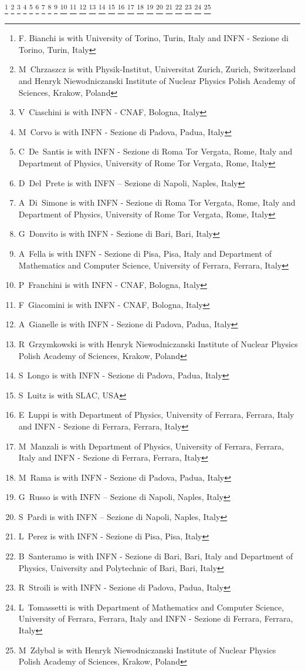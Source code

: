 \documentclass[journal]{IEEEtran}
\begin{document}
{\thanks{F. Bianchi is with University of Torino, Turin, Italy and INFN - Sezione di Torino, Turin, Italy}%
\thanks{M~Chrzaszcz is with Physik-Institut, Universitat Zurich, Zurich, Switzerland and Henryk Niewodniczanski Institute of Nuclear Physics Polish Academy of Sciences, Krakow, Poland}%
\thanks{V~Ciaschini is with INFN - CNAF, Bologna, Italy}%
\thanks{M~Corvo is with INFN - Sezione di Padova, Padua, Italy}%
\thanks{C~De~Santis is with INFN - Sezione di Roma Tor Vergata, Rome, Italy and Department of Physics, University of Rome Tor Vergata, Rome, Italy}%
\thanks{D~Del~Prete is with INFN – Sezione di Napoli, Naples, Italy}%
\thanks{A~Di~Simone is with INFN - Sezione di Roma Tor Vergata, Rome, Italy and Department of Physics, University of Rome Tor Vergata, Rome, Italy}%
\thanks{G~Donvito is with INFN - Sezione di Bari, Bari, Italy}%
\thanks{A~Fella is with INFN - Sezione di Pisa, Pisa, Italy and Department of Mathematics and Computer Science, University of Ferrara, Ferrara, Italy}%
\thanks{P~Franchini is with INFN - CNAF, Bologna, Italy}%
\thanks{F~Giacomini is with INFN - CNAF, Bologna, Italy}%
\thanks{A~Gianelle is with INFN - Sezione di Padova, Padua, Italy}%
\thanks{R~Grzymkowski is with Henryk Niewodniczanski Institute of Nuclear Physics Polish Academy of Sciences, Krakow, Poland}%
\thanks{S~Longo is with INFN - Sezione di Padova, Padua, Italy}%
\thanks{S~Luitz is with SLAC, USA}%
\thanks{E~Luppi is with Department of Physics, University of Ferrara, Ferrara, Italy and INFN - Sezione di Ferrara, Ferrara, Italy}%
\thanks{M~Manzali is with Department of Physics, University of Ferrara, Ferrara, Italy and INFN - Sezione di Ferrara, Ferrara, Italy}%
\thanks{M~Rama is with INFN - Sezione di Padova, Padua, Italy}%
\thanks{G~Russo is with INFN – Sezione di Napoli, Naples, Italy}%
\thanks{S~Pardi is with INFN – Sezione di Napoli, Naples, Italy}%
\thanks{L~Perez is with INFN - Sezione di Pisa, Pisa, Italy}%
\thanks{B~Santeramo is with INFN - Sezione di Bari, Bari, Italy and Department of Physics, University and Polytechnic of Bari, Bari, Italy}%
\thanks{R~Stroili is with INFN - Sezione di Padova, Padua, Italy}%
\thanks{L~Tomassetti is with Department of Mathematics and Computer Science, University of Ferrara, Ferrara, Italy and INFN - Sezione di Ferrara, Ferrara, Italy}%
\thanks{M~Zdybal is with Henryk Niewodniczanski Institute of Nuclear Physics Polish Academy of Sciences, Krakow, Poland}%
}

\maketitle
\pagestyle{empty}
\thispagestyle{empty}
\end{document}
